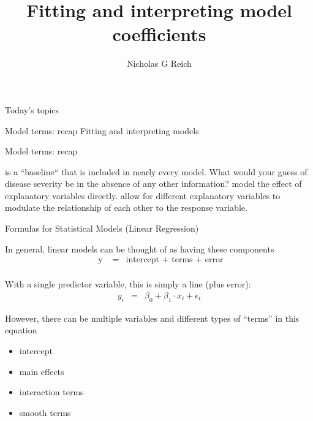 \documentclass[table]{beamer}\usepackage[]{graphicx}\usepackage[]{color}
\title{Fitting and interpreting model coefficients}
\author{Nicholas G Reich}
\begin{document}
\begin{frame}[plain]
	\titlepage
\end{frame}











\begin{frame}{Today's topics}

\bi
    \myitem Model terms: recap
    \myitem Fitting and interpreting models
\ei



\end{frame}


\begin{frame}[fragile]{Model terms: recap}

\bi
   is a ``baseline`` that is included in nearly every model. What would your guess of disease severity be in the absence of any other information?
   model the effect of explanatory variables directly.
   allow for different explanatory variables to modulate the relationship of each other to the response variable.
\ei

\end{frame}


\begin{frame}[fragile]{Formulas for Statistical Models (Linear Regression)}

In general, linear models can be thought of as having these components
\begin{eqnarray*}
\mbox{ y } & = & \mbox{intercept + terms + error} \\
\end{eqnarray*}


With a single predictor variable, this is simply a line (plus error):
\begin{eqnarray*}
y_i & = & \beta_0 + \beta_1 \cdot x_i + \epsilon_i
\end{eqnarray*}

However, there can be multiple variables and different types of ``terms'' in this equation
\begin{itemize}
    \item intercept
    \item main effects
    \item interaction terms
    \item smooth terms
\end{itemize}

\end{frame}
\end{document}
